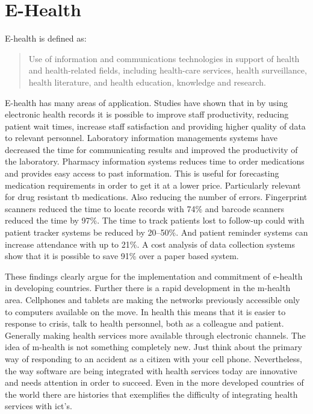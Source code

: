 
\section{E-Health}
E-health is defined as:
\begin{quotation}
Use of information and communications technologies in support of health and health-related fields, including health-care services, health surveillance, health literature, and health education, knowledge and research.
\end{quotation}

E-health has many areas of application. Studies have shown that in by using electronic health records it is possible to improve staff productivity, reducing patient wait times, increase staff satisfaction and providing higher quality of data to relevant personnel. Laboratory information managements systems have decreased the time for communicating results and improved the productivity of the laboratory. Pharmacy information systems reduces time to order medications and provides easy access to past information. This is useful for forecasting medication requirements in order to get it at a lower price. Particularly relevant for drug resistant \gls{tb} medications. Also reducing the number of errors. Fingerprint scanners reduced the time to locate records with 74\% and barcode scanners reduced the time by 97\%. The time to track patients lost to follow-up could with patient tracker systems be reduced by 20--50\%. And patient reminder systems can increase attendance with up to 21\%. A cost analysis of data collection systems show that it is possible to save 91\% over a paper based system. 

These findings clearly argue for the implementation and commitment of e-health in developing countries. 
Further there is a rapid development in the m-health area.
Cellphones and tablets are making the networks previously accessible only to computers available on the move.
In health this means that it is easier to response to crisis, talk to health personnel, both as a colleague and patient. 
Generally making health services more available through electronic channels. 
The idea of m-health is not something completely new. Just think about the primary way of responding to an accident as a citizen with your cell phone. 
Nevertheless, the way software are being integrated with health services today are innovative and needs attention in order to succeed.
Even in the more developed countries of the world there are histories that exemplifies the difficulty of integrating health services with \gls{ict}'s.  

